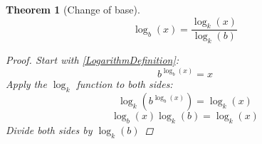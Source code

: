 \documentclass[]{article}
\newcommand{\pqty}[1]{{\left(#1\right)}}
\newtheorem{theorem}{Theorem}[section]
\numberwithin{equation}{section}
\begin{document}
	\begin{theorem}[Change of base]
		\begin{equation}
			\log_b\pqty{x}=\frac{\log_k\pqty{x}}{\log_k\pqty{b}}
		\end{equation}
		\begin{proof}
			Start with \eqref{LogarithmDefinition}:
			\begin{equation}
				b^{\log_b\pqty{x}}=x
			\end{equation}
			Apply the \(\log_k\) function to both sides:
			\begin{equation}
				\log_k\pqty{b^{\log_b\pqty{x}}}=\log_k\pqty{x}
			\end{equation}
			\begin{equation}
				\log_b\pqty{x}\log_k\pqty{b}=\log_k\pqty{x}
			\end{equation}
			Divide both sides by \(\log_k\pqty{b}\)
		\end{proof}
	\end{theorem}
\end{document}
